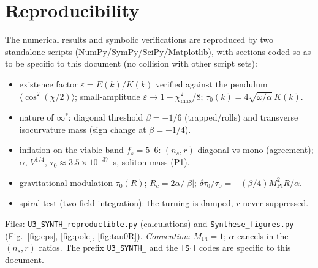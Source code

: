 \documentclass[11pt,a4paper]{article}
\newcommand{\Mpl}{M_{\mathrm{Pl}}}
\theoremstyle{definition}
\begin{document}
\section*{Reproducibility}
The numerical results and symbolic verifications are reproduced by two standalone scripts
(NumPy/SymPy/SciPy/Matplotlib), with sections coded so as to be specific to this document
(no collision with other script sets):
\begin{itemize}
\item[{\texttt{[S1]}}] existence factor $\varepsilon=E(k)/K(k)$ verified against the pendulum $\langle\cos^2(\chi/2)\rangle$; small-amplitude $\varepsilon\to1-\chi_{\max}^2/8$; $\tau_0(k)=4\sqrt{\omega/\alpha}\,K(k)$.
\item[{\texttt{[S2]}}] nature of $\infty^*$: diagonal threshold $\beta=-1/6$ (trapped/rolls) and transverse isocurvature mass (sign change at $\beta=-1/4$).
\item[{\texttt{[S3]}}] inflation on the viable band $f_s=5$--$6$: $(n_s,r)$ diagonal vs mono (agreement); $\alpha$, $V^{1/4}$, $\tau_0\approx3.5\times10^{-37}$~s, soliton mass (P1).
\item[{\texttt{[S4]}}] gravitational modulation $\tau_0(R)$; $R_c=2\alpha/|\beta|$; $\delta\tau_0/\tau_0=-(\beta/4)\Mpl^2R/\alpha$.
\item[{\texttt{[S5]}}] spiral test (two-field integration): the turning is damped, $r$ never suppressed.
\end{itemize}
Files: \texttt{U3\_SYNTH\_reproductible.py} (calculations) and \texttt{Synthese\_figures.py}
(Fig.~\ref{fig:eps}, \ref{fig:pole}, \ref{fig:tau0R}). \emph{Convention}: $\Mpl=1$; $\alpha$
cancels in the $(n_s,r)$ ratios. The prefix \texttt{U3\_SYNTH\_} and the \texttt{[S$\cdot$]}
codes are specific to this document.
\end{document}
